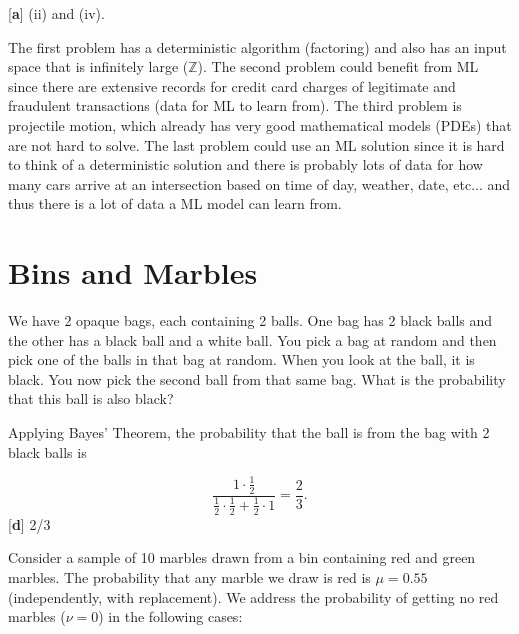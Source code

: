 \documentclass[answers]{exam}
\begin{document}
\begin{questions}
\begin{solution}
{[\textbf{a}]} (ii) and (iv).

The first problem has a deterministic algorithm (factoring) and also has an 
input space that is infinitely large ($\mathbb{Z}$). The second problem 
could benefit from ML since there are extensive records for credit card 
charges of legitimate and fraudulent transactions (data for ML to learn
from). The third problem is projectile motion, which already has very good
mathematical models (PDEs) that are not hard to solve. The last problem
could use an ML solution since it is hard to think of a deterministic solution
and there is probably lots of data for how many cars arrive at an intersection 
based on time of day, weather, date, etc... and thus there is a lot of data 
a ML model can learn from.
\end{solution}

\end{questions}

\section{Bins and Marbles}

\begin{questions}
\setcounter{question}{2}

\question We have 2 opaque bags, each containing 2 balls. One bag has 2 black 
balls and the other has a black ball and a white ball. You pick a bag at random 
and then pick one of the balls in that bag at random. When you look at the ball,
it is black. You now pick the second ball from that same bag. What is the
probability that this ball is also black?

\begin{solution}
Applying Bayes' Theorem, the probability that the ball is from the bag with 2 
black balls is 

\[
    \frac{1 \cdot \frac{1}{2}}{\frac{1}{2} \cdot \frac{1}{2} + \frac{1}{2} \cdot 1} = \frac{2}{3}
.\] 
{[\textbf{d}]} 2/3
\end{solution}

\end{questions}

Consider a sample of 10 marbles drawn from a bin containing red and green marbles.
The probability that any marble we draw is red is $\mu = 0.55$ (independently, with
replacement). We address the probability of getting no red marbles ($\nu = 0$) 
in the following cases:
\end{document}
